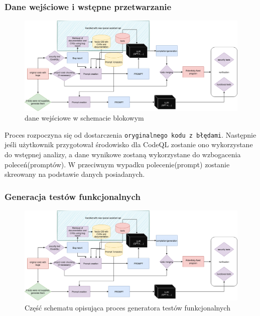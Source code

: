\subsubsection{Dane wejściowe i wstępne przetwarzanie}
\begin{figure}[h]
    \centering
    \includegraphics[clip, trim=0cm 4cm 29cm 6cm, width=0.9\linewidth]{img/gptester.drawio.png}
    \caption{dane wejściowe w schemacie blokowym}
    \label{fig:przyciety_obrazek}
\end{figure}
Proces rozpoczyna się od dostarczenia \texttt{oryginalnego kodu z błędami}. Następnie jeśli użytkownik przygotował środowisko dla CodeQL zostanie ono wykorzystane do wstępnej analizy, a dane wynikowe zostaną wykorzystane do wzbogacenia poleceń(promptów). 
W przeciwnym wypadku polecenie(prompt) zostanie skreowany na podstawie danych posiadanych. 

\subsubsection{Generacja testów funkcjonalnych}
\begin{figure}[h]
    \centering
    \includegraphics[clip, trim=0cm 0cm 0cm 13cm, width=0.9\linewidth]{img/gptester.drawio.png}
    \caption{Część schematu opisująca proces generatora testów funkcjonalnych}
    \label{fig:przyciety_obrazz}
\end{figure}

